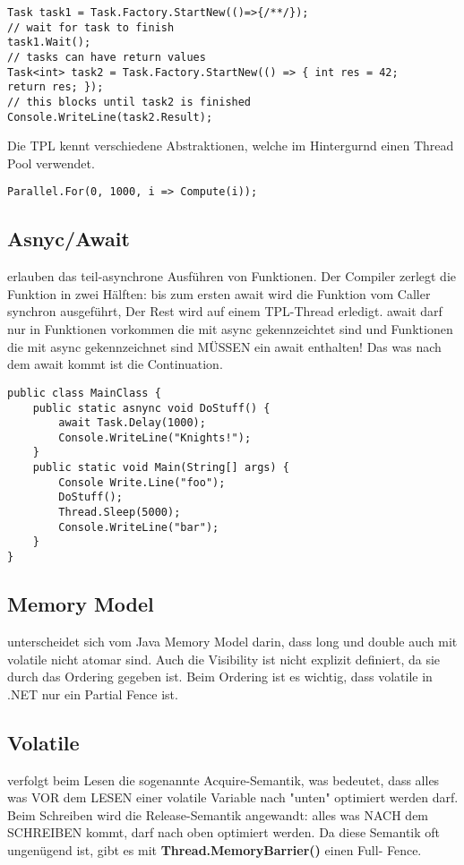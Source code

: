 \begin{lstlisting}[style=Csharp]
Task task1 = Task.Factory.StartNew(()=>{/**/});
// wait for task to finish
task1.Wait();
// tasks can have return values
Task<int> task2 = Task.Factory.StartNew(() => { int res = 42; 
return res; });
// this blocks until task2 is finished
Console.WriteLine(task2.Result);
\end{lstlisting}

Die TPL kennt verschiedene Abstraktionen, welche im Hintergurnd einen Thread Pool verwendet.

\begin{lstlisting}[style=Csharp]
Parallel.For(0, 1000, i => Compute(i));
\end{lstlisting}

\subsection{Asnyc/Await}
erlauben das teil-asynchrone Ausführen von Funktionen. Der Compiler zerlegt die Funktion in zwei Hälften: bis zum ersten await wird die Funktion vom Caller synchron ausgeführt, Der Rest wird auf einem TPL-Thread erledigt. await darf nur in Funktionen vorkommen die mit async gekennzeichtet sind und Funktionen die mit async gekennzeichnet sind MÜSSEN ein await enthalten! Das was nach dem await kommt ist die Continuation.

\begin{lstlisting}[style=Csharp]
public class MainClass {
	public static asnync void DoStuff() {
		await Task.Delay(1000);
		Console.WriteLine("Knights!");
	}
	public static void Main(String[] args) {
		Console Write.Line("foo");
		DoStuff();
		Thread.Sleep(5000);
		Console.WriteLine("bar");
	}
}
\end{lstlisting}

\subsection{Memory Model}
unterscheidet sich vom Java Memory Model darin, dass long und double auch mit volatile nicht atomar sind. Auch die Visibility ist nicht explizit definiert, da sie durch das Ordering gegeben ist. Beim Ordering ist es wichtig, dass volatile in .NET nur ein Partial Fence ist.

\subsection{Volatile}
verfolgt beim Lesen die sogenannte Acquire-Semantik, was bedeutet, dass alles was VOR dem LESEN einer volatile Variable nach "unten" optimiert werden darf. Beim Schreiben wird die Release-Semantik angewandt: alles was NACH dem SCHREIBEN kommt, darf nach oben optimiert werden. Da diese Semantik oft ungenügend ist, gibt es mit \textbf{Thread.MemoryBarrier()} einen Full- Fence.

